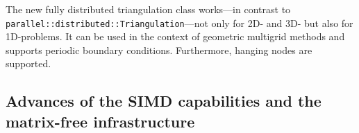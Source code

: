 \documentclass{ansarticle-preprint}
\begin{document}


The new fully distributed triangulation class works---in contrast to  
\texttt{parallel::distributed::\allowbreak Tri\-an\-gu\-la\-tion}---not only for 2D- and 3D- but also for 
1D-problems. It can be used in the context of geometric multigrid methods and 
supports periodic boundary conditions. Furthermore, hanging nodes are supported.



\subsection{Advances of the SIMD capabilities and the matrix-free infrastructure}
\label{subsec:mf}

\end{document}
